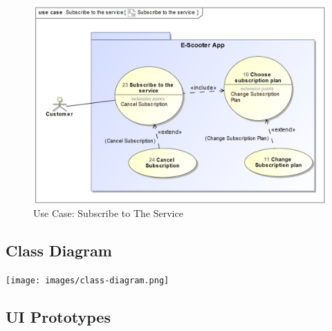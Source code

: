 \documentclass[a4paper, 12pt]{article}
\begin{document}
\begin{figure} [htbp]
  \begin{center}
    \includegraphics[scale=0.7]{images/UseCases/SubscribeToTheService.png}
  \end{center}
  \caption{Use Case: Subscribe to The Service}
\end{figure}



\newpage
\subsection{Class Diagram}
  \begin{center}
    \texttt{[image: images/class-diagram.png]}
  \end{center}
  
\newpage


\newpage
\subsection{UI Prototypes}
\end{document}
